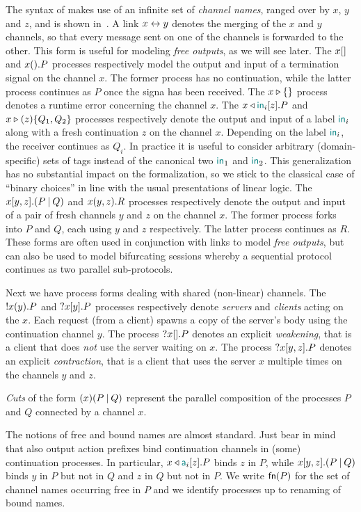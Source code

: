The syntax of \Calculus makes use of an infinite set of \emph{channel names},
ranged over by $x$, $y$ and $z$, and is shown in~.
%
A link $x\leftrightarrow y$ denotes the merging of the $x$ and $y$ channels, so that
every message sent on one of the channels is forwarded to the other. This form
is useful for modeling \emph{free outputs}, as we will see later.
%
The $x[]$ and $x().P$ processes respectively model the output and input
of a termination signal on the channel $x$. The former process has no
continuation, while the latter process continues as $P$ once the signa has been
received.
%
The $x \triangleright \{\}$ process denotes a runtime error concerning the channel $x$.
%
The $\Select\x{\InTag_i}\z.P$ and $\Case\x\z{Q_1}{Q_2}$ processes respectively
denote the output and input of a label $\mathsf{\color{teal}in}_i$ along with a fresh
continuation $z$ on the channel $x$. Depending on the label $\mathsf{\color{teal}in}_i$, the
receiver continues as $Q_i$. In practice it is useful to consider arbitrary
(domain-specific) sets of tags instead of the canonical two $\mathsf{\color{teal}in}_1$ and
$\mathsf{\color{teal}in}_2$. This generalization has no substantial impact on the formalization,
so we stick to the classical case of ``binary choices'' in line with the usual
presentations of linear logic.
%
The $\Fork\x\y\z{P}{Q}$ and $\Join\x\y\z.R$ processes respectively denote the
output and input of a pair of fresh channels $y$ and $z$ on the channel $x$. The
former process forks into $P$ and $Q$, each using $y$ and $z$ respectively. The
latter process continues as $R$. These forms are often used in conjunction with
links to model \emph{free outputs}, but can also be used to model bifurcating
sessions whereby a sequential protocol continues as two parallel sub-protocols.

Next we have process forms dealing with shared (non-linear) channels. The
${!}x(y).P$ and ${?}x[y].P$ processes respectively denote \emph{servers}
and \emph{clients} acting on the $x$. Each request (from a client) spawns a copy
of the server's body using the continuation channel $y$. The process
${?}x[].P$ denotes an explicit \emph{weakening}, that is a client that does
\emph{not} use the server waiting on $x$. The process ${?}x[y,z].P$
denotes an explicit \emph{contraction}, that is a client that uses the server
$x$ multiple times on the channels $y$ and $z$.

\emph{Cuts} of the form $(x)(P\mathbin| Q)$ represent the parallel composition of the
processes $P$ and $Q$ connected by a channel $x$.

The notions of free and bound names are almost standard. Just bear in mind that
also output action prefixes bind continuation channels in (some) continuation
processes. In particular, $\Select\x{\Tag_i}\z.P$ binds $z$ in $P$, while
$\Fork\x\y\z{P}{Q}$ binds $y$ in $P$ but not in $Q$ and $z$ in $Q$ but not in
$P$.
%
We write $\mathsf{fn}(P)$ for the set of channel names occurring free in $P$ and we
identify processes up to renaming of bound names.

